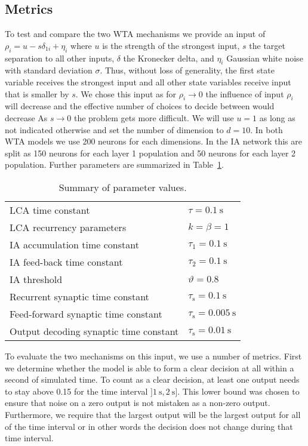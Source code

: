 \documentclass[10pt,letterpaper]{article}
\begin{document}
\subsection{Metrics}
To test and compare the two WTA mechanisms we provide an input of $\rho_i 
= u - s \delta_{1i} + \eta_i$ where $u$ is the strength of the strongest input, 
$s$ the target separation to all other inputs, $\delta$ the Kronecker delta, and 
$\eta_i$ Gaussian white noise with standard deviation $\sigma$. Thus, without 
loss of generality, the first state variable receives the strongest input and 
all other state variables receive input that is smaller by $s$. We chose this 
input as for $\rho_i \rightarrow 0$ the influence of input $\rho_i$ will 
decrease and the effective number of choices to decide between would decrease  
As $s \rightarrow 0$ the problem gets more difficult. We will use $u = 1$ as 
long as not indicated otherwise and set the number of dimension to $d = 10$.  In 
both WTA models we use 200 neurons for each dimensions. In the IA network this 
are split as 150 neurons for each layer 1 population and 50 neurons for each 
layer 2 population. Further parameters are summarized in Table~\ref{tbl:params}.
\begin{table}
    \caption{Summary of parameter values.}\label{tbl:params}
    \begin{tabular}{ll}
        LCA time constant & $\tau = \SI{0.1}{\second}$ \\
        LCA recurrency parameters & $k = \beta = 1$ \\
        IA accumulation time constant & $\tau_1 = \SI{0.1}{\second}$ \\
        IA feed-back time constant & $\tau_2 = \SI{0.1}{\second}$ \\
        IA threshold & $\vartheta = 0.8$ \\
        Recurrent synaptic time constant & $\tau_{\mathrm{s}} 
        = \SI{0.1}{\second}$ \\
        Feed-forward synaptic time constant & $\tau_{\mathrm{s}} 
        = \SI{0.005}{\second}$ \\
        Output decoding synaptic time constant & $\tau_{\mathrm{s}} 
        = \SI{0.01}{\second}$
    \end{tabular}
\end{table}

To evaluate the two mechanisms on this input, we use a number of metrics. First 
we determine whether the model is able to form a clear decision at all within 
a second of simulated time. To count as a clear decision, at least one output 
needs to stay above 0.15 for the time interval
$]\SI{1}{\second}, \SI{2}{\second}]$. %
This lower bound was chosen to ensure that noise on a zero output is not 
mistaken as a non-zero output.  Furthermore, we require that the largest output 
will be the largest output for all of the time interval or in other words the 
decision does not change during that time interval.
\end{document}
